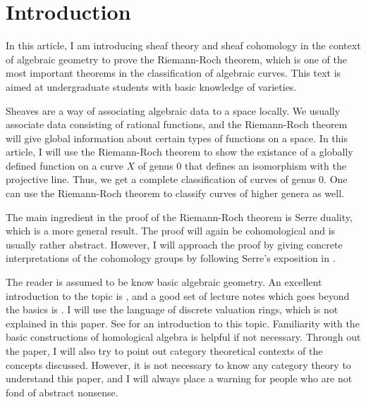 \section*{Introduction}
In this article, I am introducing sheaf theory and sheaf cohomology
in the context of algebraic geometry to prove the Riemann-Roch theorem,
which is one of the most important theorems in the classification
of algebraic curves. This text is aimed at undergraduate students with
basic knowledge of varieties.

Sheaves are a way of associating algebraic data to a space locally. We
usually associate data consisting of rational functions, and the
Riemann-Roch theorem will give global information about certain types of
functions on a space. In this article, I will use the Riemann-Roch theorem
to show the existance of a globally defined function on a curve $X$ of genus
0 that defines an isomorphism with the projective line. Thus, we get a
complete classification of curves of genus 0. One can use the Riemann-Roch
theorem to classify curves of higher genera as well.

The main ingredient in the proof of the Riemann-Roch theorem is Serre
duality, which is a more general result. The proof will again
be cohomological and is usually rather abstract. However, I will
approach the proof by giving concrete interpretations of
the cohomology groups by following Serre's exposition in \cite{serre}.

The reader is assumed to be know basic algebraic geometry. An excellent
introduction to the topic is \cite{reid}, and a good set of lecture notes
which goes beyond the basics is \cite{gathmann}. I will use the language
of discrete valuation rings, which is not explained in this paper. See
\cite{fulton} for an introduction to this topic. Familiarity with the basic
constructions of homological algebra is helpful if not necessary. Through
out the paper, I will also try to point out category theoretical contexts of
the concepts discussed. However, it is not necessary to know any category
theory to understand this paper, and I will always place a warning for
people who are not fond of abstract nonsense.
